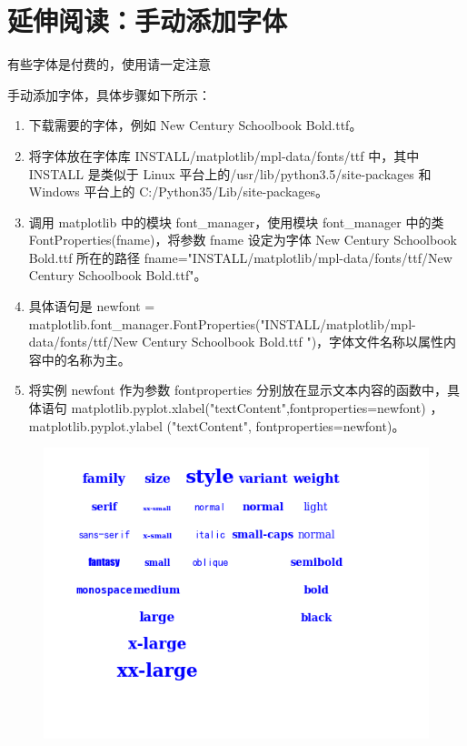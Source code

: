 \section{延伸阅读：手动添加字体}
\begin{tcolorbox}
    有些字体是付费的，使用请一定注意
\end{tcolorbox}

手动添加字体，具体步骤如下所示：
\begin{enumerate}
    \item 下载需要的字体，例如 New Century Schoolbook Bold.ttf。
    \item 将字体放在字体库 INSTALL/matplotlib/mpl-data/fonts/ttf 中，其中 INSTALL 是类似于 Linux
          平台上的/usr/lib/python3.5/site-packages 和 Windows 平台上的 C:/Python35/Lib/site-packages。
    \item 调用 matplotlib 中的模块 font\_manager，使用模块 font\_manager 中的类 FontProperties(fname)，将参数 fname 设定为字体 New Century Schoolbook Bold.ttf 所在的路径 fname="INSTALL/matplotlib/mpl-data/fonts/ttf/New Century Schoolbook Bold.ttf"。
    \item 具体语句是 newfont = matplotlib.font\_manager.FontProperties("INSTALL/matplotlib/mpl-data/fonts/ttf/New Century Schoolbook Bold.ttf ")，字体文件名称以属性内容中的名称为主。
    \item 将实例 newfont 作为参数 fontproperties 分别放在显示文本内容的函数中，具体语句 matplotlib.pyplot.xlabel("textContent",fontproperties=newfont) ， matplotlib.pyplot.ylabel ("textContent", fontproperties=newfont)。
\end{enumerate}
\begin{figure}
    \centering
    \includegraphics{9787121348884/img/fig11-5.png}
\end{figure}